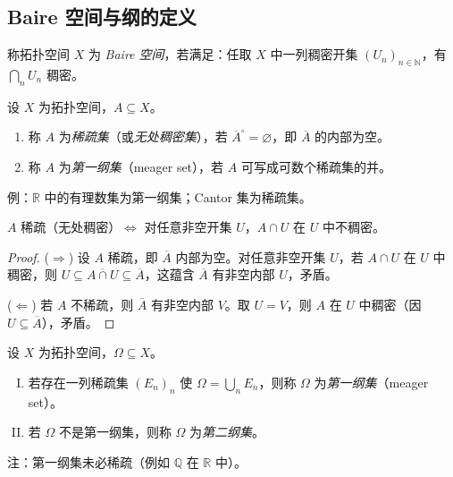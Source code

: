 \documentclass[lang=cn,a4paper,newtx,figureplace=section,tableplace=section]{elegantbook}
\begin{document}
\subsection{Baire 空间与纲的定义}

\begin{definition}[Baire 空间]\label{def:baire-space}
  称拓扑空间 $X$ 为 \emph{Baire 空间}，若满足：任取 $X$ 中一列稠密开集 $(U_n)_{n\in\mathbb N}$，有 $\bigcap_{n}U_n$ 稠密。
\end{definition}

\begin{definition}[稀疏集与第一纲集]\label{def:meager-nowhere-dense}
  设 $X$ 为拓扑空间，$A\subseteq X$。
  \begin{enumerate}[(1)]
    \item 称 $A$ 为\emph{稀疏集}（或\emph{无处稠密集}），若 $\overline A^\circ=\varnothing$，即 $\overline A$ 的内部为空。
    \item 称 $A$ 为\emph{第一纲集}（meager set），若 $A$ 可写成可数个稀疏集的并。
  \end{enumerate}
  例：$\mathbb R$ 中的有理数集为第一纲集；Cantor 集为稀疏集。
\end{definition}

\begin{proposition}\label{prop:nowhere-dense-equiv}
  $A$ 稀疏（无处稠密）$\Leftrightarrow$ 对任意非空开集 $U$，$A\cap U$ 在 $U$ 中不稠密。
\end{proposition}
\begin{proof}
  ($\Rightarrow$) 设 $A$ 稀疏，即 $\overline A$ 内部为空。对任意非空开集 $U$，若 $A\cap U$ 在 $U$ 中稠密，则 $U\subseteq\overline{A\cap U}\subseteq\overline A$，这蕴含 $\overline A$ 有非空内部 $U$，矛盾。
  
  ($\Leftarrow$) 若 $A$ 不稀疏，则 $\overline A$ 有非空内部 $V$。取 $U=V$，则 $A$ 在 $U$ 中稠密（因 $U\subseteq\overline A$），矛盾。
\end{proof}

\begin{definition}[第一纲与第二纲]\label{def:first-second-category}
  设 $X$ 为拓扑空间，$\Omega\subseteq X$。
  \begin{enumerate}[(I)]
    \item 若存在一列稀疏集 $(E_n)_n$ 使 $\Omega=\bigcup_n E_n$，则称 $\Omega$ 为\emph{第一纲集}（meager set）。
    \item 若 $\Omega$ 不是第一纲集，则称 $\Omega$ 为\emph{第二纲集}。
  \end{enumerate}
  注：第一纲集未必稀疏（例如 $\mathbb Q$ 在 $\mathbb R$ 中）。
\end{definition}
\end{document}
